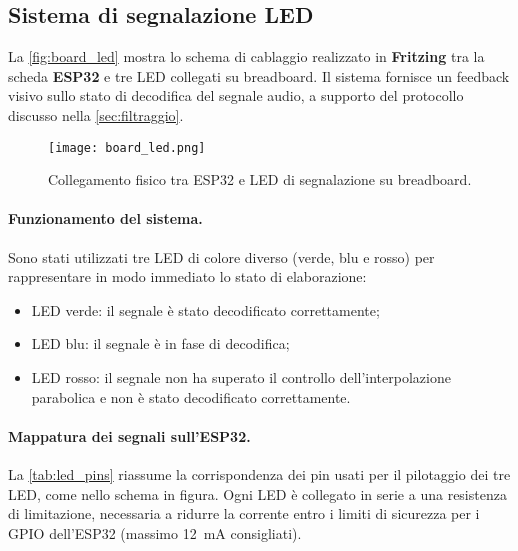 \subsection{Sistema di segnalazione LED}
\label{subsec:led_system}

La \autoref{fig:board_led} mostra lo schema di cablaggio realizzato in \textbf{Fritzing} tra la scheda \textbf{ESP32} e tre LED collegati su breadboard.  
Il sistema fornisce un feedback visivo sullo stato di decodifica del segnale audio, a supporto del protocollo discusso nella \autoref{sec:filtraggio}.  

\begin{figure}[H]
  \centering
  \texttt{[image: board\_led.png]}
  \caption{Collegamento fisico tra ESP32 e LED di segnalazione su breadboard.}
  \label{fig:board_led}
\end{figure} 

\paragraph{Funzionamento del sistema.}
Sono stati utilizzati tre LED di colore diverso (verde, blu e rosso) per rappresentare in modo immediato lo stato di elaborazione:  
\begin{itemize}
  \item LED verde: il segnale è stato decodificato correttamente;
  \item LED blu: il segnale è in fase di decodifica;
  \item LED rosso: il segnale non ha superato il controllo dell’interpolazione parabolica e non è stato decodificato correttamente.
\end{itemize}

\paragraph{Mappatura dei segnali sull'ESP32.}
La \autoref{tab:led_pins} riassume la corrispondenza dei pin usati per il pilotaggio dei tre LED, come nello schema in figura.  
Ogni LED è collegato in serie a una resistenza di limitazione, necessaria a ridurre la corrente entro i limiti di sicurezza per i GPIO dell’ESP32 (massimo \SI{12}{mA} consigliati).


